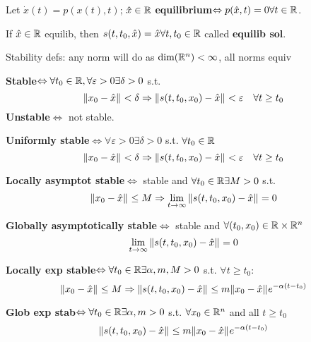 
\begin{Definition}
Let $\dot x(t)=p(x(t),t)$; $\hat x\in\mathbb R$ \textbf{equilibrium}$\Leftrightarrow p(\hat x,t)=0\forall t\in\mathbb R$. 
\end{Definition}
\begin{Fact}
If $\hat x\in\mathbb R$ equilib, then $s(t,t_0,\hat x)=\hat x\forall t,t_0\in\mathbb R$ called \textbf{equilib sol}.
\end{Fact}
Stability defs: any norm will do as $\text{dim}(\mathbb R^n)<\infty$, all norms equiv

\begin{Definition}
\textbf{Stable}$\Leftrightarrow\forall t_0\in\mathbb R,\forall\varepsilon>0\exists\delta>0$ s.t.
\begin{equation*}
\|x_0-\hat x\|_{}<\delta\Rightarrow\|s(t,t_0,x_0)-\hat x\|_{}<\varepsilon\quad\forall t\ge t_0
\end{equation*} 
\textbf{Unstable}$\Leftrightarrow$ not stable.

\textbf{Uniformly stable}$\Leftrightarrow\forall\varepsilon>0\exists\delta>0$ s.t. $\forall t_0\in\mathbb R$
\begin{equation*}
\|x_0-\hat x\|_{}<\delta\Rightarrow\|s(t,t_0,x_0)-\hat x\|_{}<\varepsilon\quad\forall t\ge t_0
\end{equation*} 

\textbf{Locally asymptot stable}$\Leftrightarrow$ stable and $\forall t_0\in\mathbb R\exists M>0$ s.t.
\begin{equation*}
\|x_0-\hat x\|_{}\le M\Rightarrow\lim_{t\to\infty}\|s(t,t_0,x_0)-\hat x\|_{}=0
\end{equation*}

\textbf{Globally asymptotically stable}$\Leftrightarrow$ stable and $\forall (t_0,x_0)\in\mathbb R\times\mathbb R^n$
\begin{equation*}
\lim_{t\to\infty}\|s(t,t_0,x_0)-\hat x\|_{}=0
\end{equation*}

\textbf{Locally exp stable}$\Leftrightarrow\forall t_0\in\mathbb R\exists\alpha,m,M>0$ s.t. $\forall t\ge t_0$:
\begin{equation*}
\|x_0-\hat x\|_{}\le M\Rightarrow\|s(t,t_0,x_0)-\hat x\|_{}\le m\|x_0-\hat x\|_{}e^{-\alpha(t-t_0)}
\end{equation*}

\textbf{Glob exp stab}$\Leftrightarrow\forall t_0\in\mathbb R\exists\alpha,m>0$ s.t. $\forall x_0\in\mathbb R^n$ and all $t\ge t_0$
\begin{equation*}
\|s(t,t_0,x_0)-\hat x\|_{}\le m\|x_0-\hat x\|_{}e^{-\alpha(t-t_0)}
\end{equation*}
\end{Definition}


